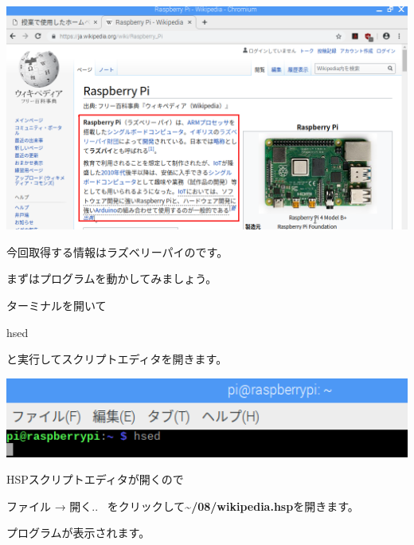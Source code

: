 \documentclass[a4paper,12pt,dvipdfmx]{jarticle}
\begin{document}
\begin{center}
\includegraphics[width=17.006cm]{textbook-img059.png}

\end{center}
今回取得する情報はラズベリーパイのです。

まずはプログラムを動かしてみましょう。

ターミナルを開いて

hsed

と実行してスクリプトエディタを開きます。



\begin{center}
\includegraphics[width=17.057cm]{textbook-img013.png}

\end{center}

\bigskip

\clearpage
HSPスクリプトエディタが開くので


\bigskip

ファイル → 開く..
\ をクリックして\textbf{{\textasciitilde}/08/wikipedia.hsp}を開きます。

プログラムが表示されます。
\end{document}
